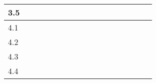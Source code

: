 \begin{table}[H]
{\begin{tabular}{|l|l|l|l|l|l|l|l|l|l|l|l|l|l|l|l|l|}
3.5       &                          &                                                 &                          &                          &                          & \cellcolor[HTML]{000000} &                          &                          &                                                 &                                                 &                                                 &                          &                          &                          &                          &                          \\ \hline
4.1       &                          &                                                 &                          &                          &                          &                          & \cellcolor[HTML]{000000} &                          &                                                 &                                                 &                                                 &                          &                          &                          &                          &                          \\ \hline
4.2       &                          &                                                 &                          &                          &                          &                          & \cellcolor[HTML]{000000} &                          &                                                 &                                                 &                                                 &                          &                          &                          &                          &                          \\ \hline
4.3       &                          &                                                 &                          &                          &                          &                          & \cellcolor[HTML]{000000} &                          &                                                 &                                                 &                                                 &                          &                          &                          &                          &                          \\ \hline
4.4       &                          &                                                 &                          &                          &                          &                          & \cellcolor[HTML]{000000} &                          &                                                 &                                                 &                                                 &                          &                          &                          &                          &                          \\ \hline

\end{tabular}}
\end{table}
